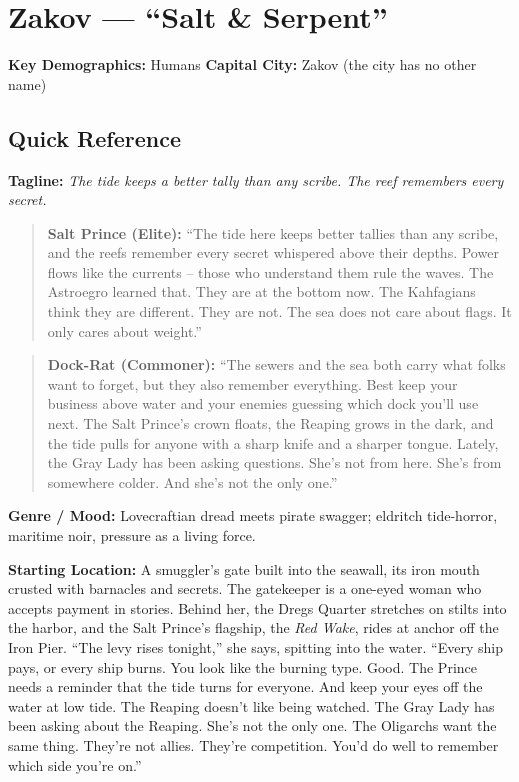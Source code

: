 \section{Zakov --- ``Salt \& Serpent''}
\label{chap:zakov}

\textbf{Key Demographics: } Humans
\textbf{Capital City: } Zakov (the city has no other name)

\subsection*{Quick Reference}
\textbf{Tagline:} \textit{The tide keeps a better tally than any scribe. The reef remembers every secret.}

\begin{quote}
  \textbf{Salt Prince (Elite):}  
  ``The tide here keeps better tallies than any scribe, and the reefs remember every secret whispered above their depths. Power flows like the currents -- those who understand them rule the waves. The Astroegro learned that. They are at the bottom now. The Kahfagians think they are different. They are not. The sea does not care about flags. It only cares about weight.''
\end{quote}

\begin{quote}
  \textbf{Dock-Rat (Commoner):}  
  ``The sewers and the sea both carry what folks want to forget, but they also remember everything. Best keep your business above water and your enemies guessing which dock you'll use next. The Salt Prince's crown floats, the Reaping grows in the dark, and the tide pulls for anyone with a sharp knife and a sharper tongue. Lately, the Gray Lady has been asking questions. She's not from here. She's from somewhere colder. And she's not the only one.''
\end{quote}

\noindent\textbf{Genre / Mood:} Lovecraftian dread meets pirate swagger; eldritch tide-horror, maritime noir, pressure as a living force.

\noindent\textbf{Starting Location:} A smuggler's gate built into the seawall, its iron mouth crusted with barnacles and secrets. The gatekeeper is a one-eyed woman who accepts payment in stories. Behind her, the Dregs Quarter stretches on stilts into the harbor, and the Salt Prince's flagship, the \textit{Red Wake}, rides at anchor off the Iron Pier. ``The levy rises tonight,'' she says, spitting into the water. ``Every ship pays, or every ship burns. You look like the burning type. Good. The Prince needs a reminder that the tide turns for everyone. And keep your eyes off the water at low tide. The Reaping doesn't like being watched. The Gray Lady has been asking about the Reaping. She's not the only one. The Oligarchs want the same thing. They're not allies. They're competition. You'd do well to remember which side you're on.''

